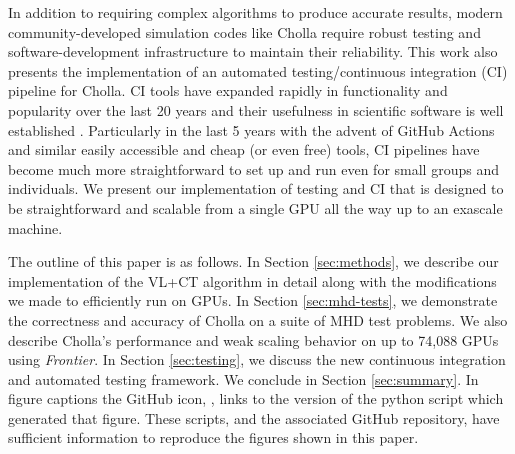 In addition to requiring complex algorithms to produce accurate results, modern community-developed simulation codes like Cholla require robust testing and software-development infrastructure to maintain their reliability. This work also presents the implementation of an automated testing/continuous integration (CI) pipeline for Cholla. CI tools have expanded rapidly in functionality and popularity over the last 20 years and their usefulness in scientific software is well established \citep{beck_1999, wilson_2014,wilson_2017}. Particularly in the last 5 years with the advent of GitHub Actions and similar easily accessible and cheap (or even free) tools, CI pipelines have become much more straightforward to set up and run even for small groups and individuals. We present our implementation of testing and CI that is designed to be straightforward and scalable from a single GPU all the way up to an exascale machine. 

The outline of this paper is as follows. In Section \ref{sec:methods}, we describe our implementation of the VL+CT algorithm in detail along with the modifications we made to efficiently run on GPUs. In Section \ref{sec:mhd-tests}, we demonstrate the correctness and accuracy of Cholla on a suite of MHD test problems. We also describe Cholla's performance and weak scaling behavior on up to 74,088 GPUs using \textit{Frontier}. In Section \ref{sec:testing}, we discuss the new continuous integration and automated testing framework. We conclude in Section \ref{sec:summary}. In figure captions the GitHub icon, , links to the version of the python script which generated that figure. These scripts, and the associated GitHub repository, have sufficient information to reproduce the figures shown in this paper.
